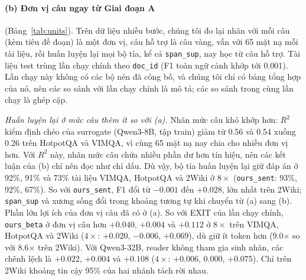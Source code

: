 \documentclass[11pt]{article}
\newcommand{\arm}[1]{\texttt{#1}}
\begin{document}
\paragraph{(b) Đơn vị câu ngay từ Giai đoạn A} (Bảng~\ref{tab:units}). Trên dữ liệu nhiều bước, chúng tôi đo lại
nhãn với mỗi câu (kèm tiêu đề đoạn) là một đơn vị, câu hỗ trợ là câu vàng, vẫn với 65 mặt nạ mỗi tài liệu, rồi huấn
luyện lại mọi bộ tỉa, kể cả \arm{span\_sup}, nay học từ câu hỗ trợ. Tài liệu test trùng lần chạy chính theo
\texttt{doc\_id} (F1 toàn ngữ cảnh khớp tới 0.001). Lần chạy này không có các bộ nén đã công bố, và chúng tôi chỉ có
bảng tổng hợp của nó, nên các so sánh với lần chạy chính là mô tả; các so sánh trong cùng lần chạy là ghép cặp.

\emph{Huấn luyện lại ở mức câu thêm ít so với (a).} Nhãn mức câu khó khớp hơn: $R^2$ kiểm định chéo của surrogate
(Qwen3-8B, tập train) giảm từ 0.56 và 0.54 xuống 0.26 trên HotpotQA và VIMQA, vì cùng 65 mặt nạ nay chia cho nhiều đơn
vị hơn. Với $R^2$ này, nhãn mức câu chứa nhiều phần dư hơn tín hiệu, nên các kết luận của (b) chỉ nên đọc như chỉ dấu.
Dù vậy, bộ tỉa huấn luyện lại giữ đáp án ở 92\%, 91\% và 73\% tài liệu VIMQA, HotpotQA và 2Wiki ở $8\times$
(\arm{ours\_sent}: 93\%, 92\%, 67\%). So với \arm{ours\_sent}, F1 đổi từ $-0.001$ đến $+0.028$, lớn nhất trên 2Wiki;
\arm{span\_sup} và xương sống đổi trong khoảng tương tự khi chuyển từ (a) sang (b). Phần lớn lợi ích của đơn vị câu
đã có ở (a). So với EXIT của lần chạy chính, \arm{ours\_beta} ở đơn vị câu hơn $+0.040$, $+0.004$ và $+0.112$ ở
$8\times$ trên VIMQA, HotpotQA và 2Wiki ($4\times$: $+0.020$, $-0.006$, $+0.069$), dù giữ ít token hơn (9.0$\times$ so
với 8.6$\times$ trên 2Wiki). Với Qwen3-32B, reader không tham gia sinh nhãn, các chênh lệch là $+0.022$, $+0.004$ và
$+0.108$ ($4\times$: $+0.006$, $0.000$, $+0.075$). Chỉ trên 2Wiki khoảng tin cậy 95\% của hai nhánh tách rời nhau.
\end{document}
